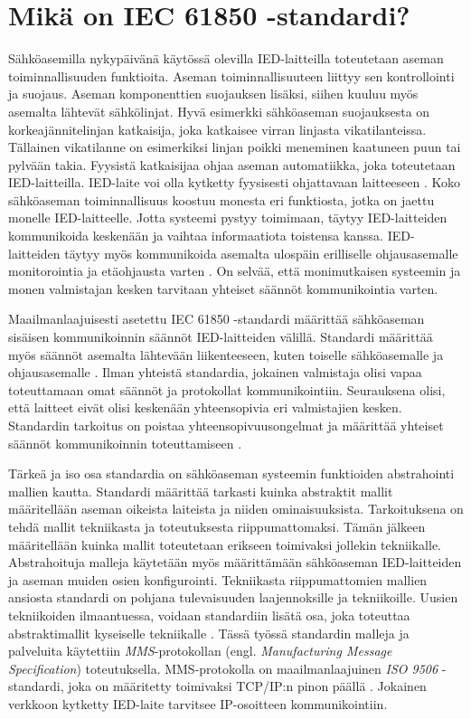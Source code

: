 \chapter{Mikä on IEC 61850 -standardi?}
\label{ch:iec61850-theory}
Sähköasemilla nykypäivänä käytössä olevilla IED-laitteilla toteutetaan aseman toiminnallisuuden funktioita. Aseman toiminnallisuuteen liittyy sen kontrollointi ja suojaus. Aseman komponenttien suojauksen lisäksi, siihen kuuluu myös asemalta lähtevät sähkölinjat. Hyvä esimerkki sähköaseman suojauksesta on korkeajännitelinjan katkaisija, joka katkaisee virran linjasta vikatilanteissa. Tällainen vikatilanne on esimerkiksi linjan poikki meneminen kaatuneen puun tai pylvään takia. Fyysistä katkaisijaa ohjaa aseman automatiikka, joka toteutetaan IED-laitteilla. IED-laite voi olla kytketty fyysisesti ohjattavaan laitteeseen \mbox{\cite[s.~63--64]{IEC61850-7-1}}. Koko sähköaseman toiminnallisuus koostuu monesta eri funktiosta, jotka on jaettu monelle IED-laitteelle. Jotta systeemi pystyy toimimaan, täytyy IED-laitteiden kommunikoida keskenään ja vaihtaa informaatiota toistensa kanssa. IED-laitteiden täytyy myös kommunikoida asemalta ulospäin erilliselle ohjausasemalle monitorointia ja etäohjausta varten \mbox{\cite[s.~1]{Brunner2008}}. On selvää, että monimutkaisen systeemin ja monen valmistajan kesken tarvitaan yhteiset säännöt kommunikointia varten.

Maailmanlaajuisesti asetettu IEC 61850 -standardi määrittää sähköaseman sisäisen kommunikoinnin säännöt IED-laitteiden välillä. Standardi määrittää myös säännöt asemalta lähtevään liikenteeseen, kuten toiselle sähköasemalle ja ohjausasemalle \mbox{\cite[s.~10]{IEC61850-7-1}}. Ilman yhteistä standardia, jokainen valmistaja olisi vapaa toteuttamaan omat säännöt ja protokollat kommunikointiin. Seurauksena olisi, että laitteet eivät olisi keskenään yhteensopivia eri valmistajien kesken. Standardin tarkoitus on poistaa yhteensopivuusongelmat ja määrittää yhteiset säännöt kommunikoinnin toteuttamiseen \mbox{\cite[s.~1]{Kaneda2008}}.

Tärkeä ja iso osa standardia on sähköaseman systeemin funktioiden abstrahointi mallien kautta. Standardi määrittää tarkasti kuinka abstraktit mallit määritellään aseman oikeista laiteista ja niiden ominaisuuksista. Tarkoituksena on tehdä mallit tekniikasta ja toteutuksesta riippumattomaksi. Tämän jälkeen määritellään kuinka mallit toteutetaan erikseen toimivaksi jollekin tekniikalle. Abstrahoituja malleja käytetään myös määrittämään sähköaseman IED-laitteiden ja aseman muiden osien konfigurointi. Tekniikasta riippumattomien mallien ansiosta standardi on pohjana tulevaisuuden laajennoksille ja tekniikoille. Uusien tekniikoiden ilmaantuessa, voidaan standardiin lisätä  osa, joka  toteuttaa abstraktimallit kyseiselle tekniikalle \mbox{\cite[s.~2]{Brunner2008}}. Tässä työssä standardin malleja ja palveluita käytettiin \emph{MMS}-protokollan (engl. \emph{Manufacturing Message Specification}) toteutuksella. MMS-protokolla on maailmanlaajuinen \emph{ISO 9506} -standardi, joka on määritetty toimivaksi TCP/IP:n pinon päällä \mbox{\cite{MMS-protocol-stack-and-API}}. Jokainen verkkoon kytketty IED-laite tarvitsee IP-osoitteen kommunikointiin.



